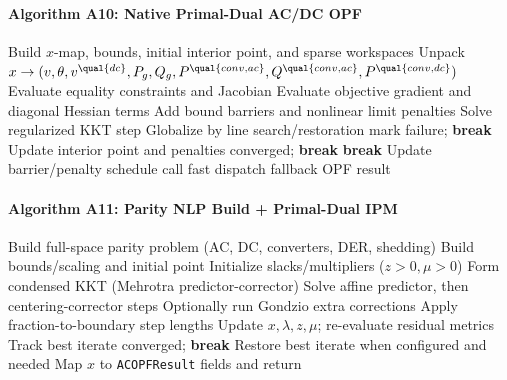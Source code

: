 \paragraph{Algorithm A10: Native Primal-Dual AC/DC OPF}
\begin{algorithmic}[1]
  \State Build \(x\)-map, bounds, initial interior point, and sparse workspaces
      \State Unpack \(x \rightarrow (v,\theta,v^{\qual{dc}},P_g,Q_g,P^{\qual{conv,ac}},Q^{\qual{conv,ac}},P^{\qual{conv,dc}})\)
      \State Evaluate equality constraints and Jacobian
      \State Evaluate objective gradient and diagonal Hessian terms
      \State Add bound barriers and nonlinear limit penalties
      \State Solve regularized KKT step
      \State Globalize by line search/restoration
       \State mark failure; \textbf{break} \EndIf
      \State Update interior point and penalties
       \State converged; \textbf{break} \EndIf
    \EndFor
     \State \textbf{break} \EndIf
    \State Update barrier/penalty schedule
  \EndFor
   \State call fast dispatch fallback \EndIf
  \State \Return OPF result
\EndProcedure
\end{algorithmic}

\paragraph{Algorithm A11: Parity NLP Build + Primal-Dual IPM}
\begin{algorithmic}[1]
  \State Build full-space parity problem (AC, DC, converters, DER, shedding)
  \State Build bounds/scaling and initial point
  \State Initialize slacks/multipliers (\(z>0,\mu>0\))
    \State Form condensed KKT (Mehrotra predictor-corrector)
    \State Solve affine predictor, then centering-corrector steps
    \State Optionally run Gondzio extra corrections
    \State Apply fraction-to-boundary step lengths
    \State Update \(x,\lambda,z,\mu\); re-evaluate residual metrics
    \State Track best iterate
      \State converged; \textbf{break}
    \EndIf
  \EndFor
  \State Restore best iterate when configured and needed
  \State Map \(x\) to \texttt{ACOPFResult} fields and return
\EndProcedure
\end{algorithmic}

